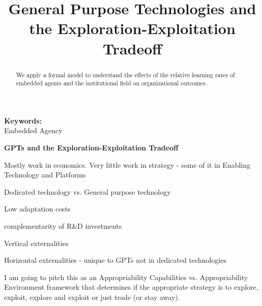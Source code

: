 \documentclass[12pt,letterpaper]{article}
\begin{document}
\title{General Purpose Technologies and the Exploration-Exploitation Tradeoff}
\date{}
\maketitle

\begin{abstract} 
\normalsize 
We apply a formal model to understand the effects of the relative learning rates of embedded agents and the institutional field on organizational outcomes. 
\end{abstract}


{\textbf{Keywords:} \\\indent Embedded Agency}

\newpage
\pagestyle{fancy}
\fancyhf{}
\rhead{\thepage}

\begin{center}
\textbf{GPTs and the Exploration-Exploitation Tradeoff}
\end{center}



\cite{Arora2003} \par
\cite{Bresnahan1995} \par
\cite{Gambardella2010} \par
\cite{Maine2006} \par
\cite{Nelson1959} \par
\cite{Thoma2009} \par
\cite{Boudreau2010} \par
\cite{Hosasain2011} \par
\cite{Teece2012a} \par
\cite{Rosenberg2004} \par

Mostly work in economics. Very little work in strategy - some of it in Enabling Technology and Platforms \cite{Teece2012a}

Dedicated technology vs. General purpose technology

Low adaptation costs

complementarity of R\&D investments

Vertical externalities

Horizontal externalities - unique to GPTs not in dedicated technologies

I am going to pitch this as an Appropriability Capabilities vs. Appropriability Environment framework that determines if the appropriate strategy is to explore, exploit, explore and exploit or just trade (or stay away).
\end{document}
